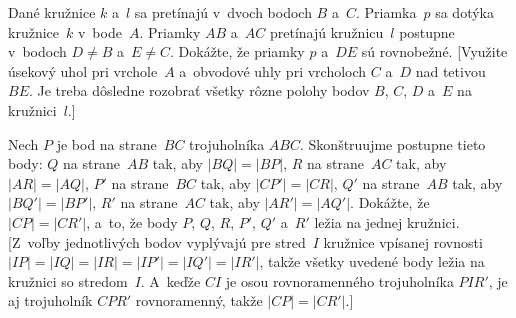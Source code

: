 {Dané kružnice $k$ a~$l$ sa pretínajú v~dvoch bodoch $B$ a~$C$. Priamka~$p$
sa dotýka kružnice~$k$ v~bode~$A$. Priamky $AB$ a~$AC$ pretínajú
kružnicu~$l$ postupne v~bodoch $D \ne B$ a~$E \ne C$. Dokážte, že priamky
$p$ a~$DE$ sú rovnobežné. [Využite úsekový uhol pri vrchole~$A$
a~obvodové uhly pri vrcholoch $C$ a~$D$ nad tetivou~$BE$. Je treba
dôsledne rozobrať všetky rôzne polohy bodov $B$, $C$, $D$ a~$E$ na
kružnici~$l$.]

\D
Nech $P$ je bod na strane~$BC$ trojuholníka $ABC$.
Skonštruujme postupne tieto body: $Q$ na strane~$AB$
tak, aby $|BQ|=|BP|$, $R$ na strane~$AC$ tak, aby $|AR|=|AQ|$, $P'$ na
strane~$BC$ tak, aby $|CP'|=|CR|$, $Q'$ na strane~$AB$ tak, aby
$|BQ'|=|BP'|$, $R'$ na strane~$AC$ tak, aby
$|AR'|=|AQ'|$. Dokážte, že $|CP|=|CR'|$, a~to, že body
$P$, $Q$, $R$, $P'$, $Q'$ a~$R'$ ležia na jednej
kružnici.
[Z~voľby jednotlivých bodov vyplývajú pre stred~$I$ kružnice vpísanej rovnosti
$|IP|=|IQ|=|IR|=|IP'|=|IQ'|=|IR'|$,
takže všetky uvedené body ležia na kružnici so stredom~$I$. A~keďže $CI$
je osou rovnoramenného trojuholníka $PIR'$, je aj trojuholník $CPR'$ rovnoramenný, takže
$|CP|=|CR'|$.]
}

